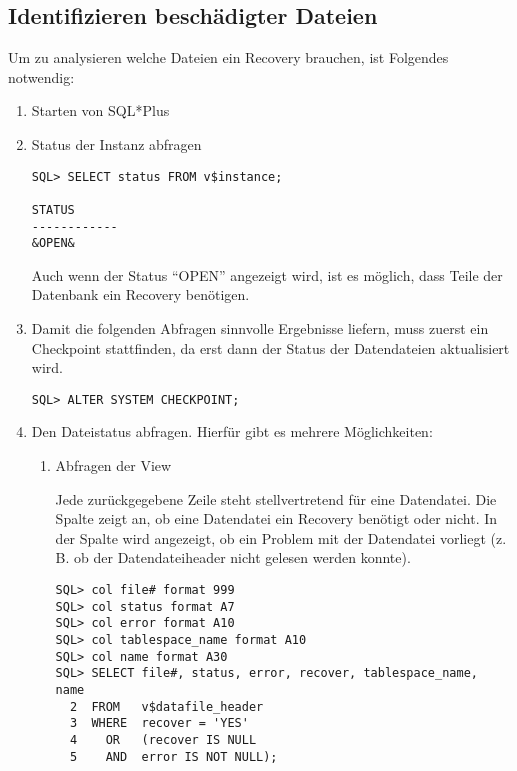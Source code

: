       \subsection{Identifizieren beschädigter Dateien}
        \label{identifyfiles}
        Um zu analysieren welche Dateien ein Recovery brauchen, ist Folgendes notwendig:
        \begin{enumerate}
          \item Starten von SQL*Plus
          \item Status der Instanz abfragen
          \begin{lstlisting}[caption={Status der Instanz abfragen},label=admin1434,language=oracle_sql]
SQL> SELECT status FROM v$instance;

STATUS
------------
&OPEN&
          \end{lstlisting}
          Auch wenn der Status \enquote{OPEN} angezeigt wird, ist es möglich,
          dass Teile der Datenbank ein Recovery benötigen.
          \item Damit die folgenden Abfragen sinnvolle Ergebnisse liefern, muss zuerst ein Checkpoint stattfinden, da erst dann der Status der Datendateien aktualisiert wird.
          \begin{lstlisting}[caption={Einen Checkpoint absetzen},label=admin1435,language=oracle_sql]
SQL> ALTER SYSTEM CHECKPOINT;
          \end{lstlisting}
          \item Den Dateistatus abfragen. Hierfür gibt es mehrere Mög\-lich\-kei\-ten:
          \begin{enumerate}
            \item Abfragen der View 

						Jede zurückgegebene Zeile steht stellvertretend für eine Datendatei. Die Spalte  zeigt an, ob eine Datendatei ein Recovery benötigt oder nicht. In der Spalte  wird angezeigt, ob ein Problem mit der Datendatei vorliegt (z. B. ob der Datendateiheader nicht gelesen werden konnte).
						\begin{lstlisting}[caption={Status der Datendateien abfragen mit	V\$DATAFILE\_HEADER},label=admin1436,language=oracle_sql,alsolanguage=sqlplus,emph={[9]FILE,OFFLINE,TABLESPACE, NOT},emphstyle={[9]\color{black}}]
SQL> col file# format 999
SQL> col status format A7
SQL> col error format A10
SQL> col tablespace_name format A10
SQL> col name format A30
SQL> SELECT file#, status, error, recover, tablespace_name, name
  2  FROM   v$datafile_header
  3  WHERE  recover = 'YES'
  4    OR   (recover IS NULL
  5    AND  error IS NOT NULL);


\end{lstlisting}
\end{enumerate}
\end{enumerate}
